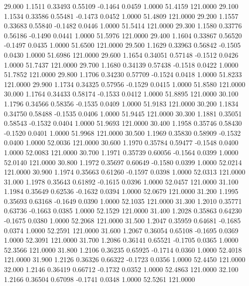   29.000   1.1511   0.33493   0.55109  -0.1464   0.0459   1.0000  51.4159 121.0000
  29.100   1.1534   0.33586   0.55481  -0.1473   0.0452   1.0000  51.4809 121.0000
  29.200   1.1557   0.33683   0.55840  -0.1482   0.0446   1.0000  51.5414 121.0000
  29.300   1.1580   0.33776   0.56186  -0.1490   0.0441   1.0000  51.5976 121.0000
  29.400   1.1604   0.33867   0.56520  -0.1497   0.0435   1.0000  51.6500 121.0000
  29.500   1.1629   0.33963   0.56842  -0.1505   0.0430   1.0000  51.6986 121.0000
  29.600   1.1654   0.34051   0.57148  -0.1512   0.0426   1.0000  51.7437 121.0000
  29.700   1.1680   0.34139   0.57438  -0.1518   0.0422   1.0000  51.7852 121.0000
  29.800   1.1706   0.34230   0.57709  -0.1524   0.0418   1.0000  51.8233 121.0000
  29.900   1.1734   0.34325   0.57956  -0.1529   0.0415   1.0000  51.8580 121.0000
  30.000   1.1764   0.34433   0.58174  -0.1533   0.0412   1.0000  51.8895 121.0000
  30.100   1.1796   0.34566   0.58356  -0.1535   0.0409   1.0000  51.9183 121.0000
  30.200   1.1834   0.34750   0.58488  -0.1535   0.0406   1.0000  51.9445 121.0000
  30.300   1.1881   0.35051   0.58543  -0.1532   0.0404   1.0000  51.9693 121.0000
  30.400   1.1958   0.35746   0.58430  -0.1520   0.0401   1.0000  51.9968 121.0000
  30.500   1.1969   0.35830   0.58909  -0.1532   0.0400   1.0000  52.0036 121.0000
  30.600   1.1970   0.35784   0.59477  -0.1548   0.0400   1.0000  52.0083 121.0000
  30.700   1.1971   0.35739   0.60056  -0.1564   0.0399   1.0000  52.0140 121.0000
  30.800   1.1972   0.35697   0.60649  -0.1580   0.0399   1.0000  52.0214 121.0000
  30.900   1.1974   0.35663   0.61260  -0.1597   0.0398   1.0000  52.0313 121.0000
  31.000   1.1978   0.35643   0.61892  -0.1615   0.0396   1.0000  52.0457 121.0000
  31.100   1.1984   0.35649   0.62536  -0.1632   0.0394   1.0000  52.0679 121.0000
  31.200   1.1995   0.35693   0.63168  -0.1649   0.0390   1.0000  52.1035 121.0000
  31.300   1.2010   0.35771   0.63736  -0.1663   0.0385   1.0000  52.1529 121.0000
  31.400   1.2028   0.35863   0.64230  -0.1675   0.0380   1.0000  52.2068 121.0000
  31.500   1.2047   0.35959   0.64681  -0.1685   0.0374   1.0000  52.2591 121.0000
  31.600   1.2067   0.36054   0.65108  -0.1695   0.0369   1.0000  52.3091 121.0000
  31.700   1.2086   0.36141   0.65521  -0.1705   0.0365   1.0000  52.3566 121.0000
  31.800   1.2106   0.36235   0.65925  -0.1714   0.0360   1.0000  52.4018 121.0000
  31.900   1.2126   0.36326   0.66322  -0.1723   0.0356   1.0000  52.4450 121.0000
  32.000   1.2146   0.36419   0.66712  -0.1732   0.0352   1.0000  52.4863 121.0000
  32.100   1.2166   0.36504   0.67098  -0.1741   0.0348   1.0000  52.5261 121.0000
